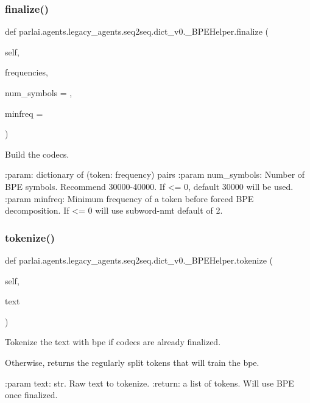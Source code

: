\subsubsection{\texorpdfstring{finalize()}{finalize()}}
{\footnotesize\ttfamily def parlai.\+agents.\+legacy\+\_\+agents.\+seq2seq.\+dict\+\_\+v0.\+\_\+\+B\+P\+E\+Helper.\+finalize (\begin{DoxyParamCaption}\item[{}]{self,  }\item[{}]{frequencies,  }\item[{}]{num\+\_\+symbols = {},  }\item[{}]{minfreq = {} }\end{DoxyParamCaption})}

\begin{DoxyVerb}Build the codecs.

:param: dictionary of (token: frequency) pairs
:param num_symbols: Number of BPE symbols. Recommend 30000-40000.
    If <= 0, default 30000 will be used.
:param minfreq: Minimum frequency of a token before forced BPE
    decomposition. If <= 0 will use subword-nmt default of 2.
\end{DoxyVerb}
 \mbox{\label{classparlai_1_1agents_1_1legacy__agents_1_1seq2seq_1_1dict__v0_1_1__BPEHelper_a33d5217e263257279fe081b02da95d8d}} 
\subsubsection{\texorpdfstring{tokenize()}{tokenize()}}
{\footnotesize\ttfamily def parlai.\+agents.\+legacy\+\_\+agents.\+seq2seq.\+dict\+\_\+v0.\+\_\+\+B\+P\+E\+Helper.\+tokenize (\begin{DoxyParamCaption}\item[{}]{self,  }\item[{}]{text }\end{DoxyParamCaption})}

\begin{DoxyVerb}Tokenize the text with bpe if codecs are already finalized.

Otherwise, returns the regularly split tokens that will train the bpe.

:param text: str. Raw text to tokenize.
:return: a list of tokens. Will use BPE once finalized.
\end{DoxyVerb}
 

